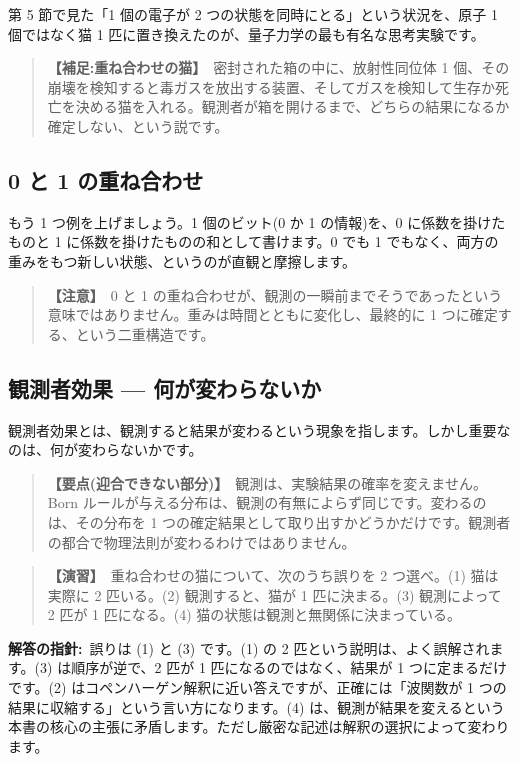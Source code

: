 \documentclass{article}
\begin{document}
第 5 節で見た「1 個の電子が 2 つの状態を同時にとる」という状況を、原子 1 個ではなく猫 1 匹に置き換えたのが、量子力学の最も有名な思考実験です。

\begin{quote}
\textbf{【補足:重ね合わせの猫】}\ 密封された箱の中に、放射性同位体 1 個、その崩壊を検知すると毒ガスを放出する装置、そしてガスを検知して生存か死亡を決める猫を入れる。観測者が箱を開けるまで、どちらの結果になるか確定しない、という説です。
\end{quote}

\subsection{0 と 1 の重ね合わせ}

もう 1 つ例を上げましょう。1 個のビット(0 か 1 の情報)を、0 に係数を掛けたものと 1 に係数を掛けたものの和として書けます。0 でも 1 でもなく、両方の重みをもつ新しい状態、というのが直観と摩擦します。

\begin{quote}
\textbf{【注意】}\ 0 と 1 の重ね合わせが、観測の一瞬前までそうであったという意味ではありません。重みは時間とともに変化し、最終的に 1 つに確定する、という二重構造です。
\end{quote}

\subsection{観測者効果 — 何が変わらないか}

観測者効果とは、観測すると結果が変わるという現象を指します。しかし重要なのは、何が変わらないかです。

\begin{quote}
\textbf{【要点(迎合できない部分)】}\ 観測は、実験結果の確率を変えません。Born ルールが与える分布は、観測の有無によらず同じです。変わるのは、その分布を 1 つの確定結果として取り出すかどうかだけです。観測者の都合で物理法則が変わるわけではありません。
\end{quote}

\begin{quote}
\textbf{【演習】}\ 重ね合わせの猫について、次のうち誤りを 2 つ選べ。(1) 猫は実際に 2 匹いる。(2) 観測すると、猫が 1 匹に決まる。(3) 観測によって 2 匹が 1 匹になる。(4) 猫の状態は観測と無関係に決まっている。
\end{quote}

\textbf{解答の指針:}\ 誤りは (1) と (3) です。(1) の 2 匹という説明は、よく誤解されます。(3) は順序が逆で、2 匹が 1 匹になるのではなく、結果が 1 つに定まるだけです。(2) はコペンハーゲン解釈に近い答えですが、正確には「波関数が 1 つの結果に収縮する」という言い方になります。(4) は、観測が結果を変えるという本書の核心の主張に矛盾します。ただし厳密な記述は解釈の選択によって変わります。
\end{document}
